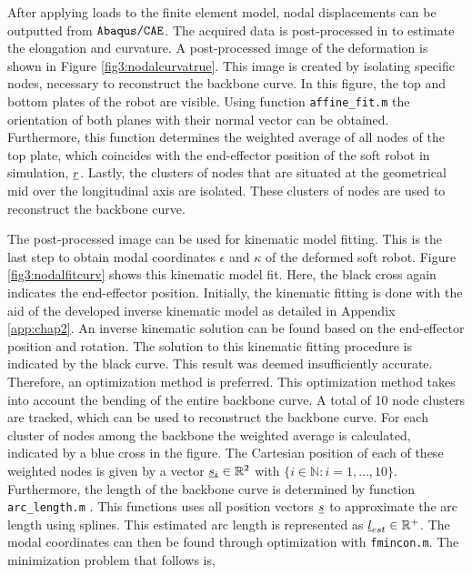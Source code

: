 After applying loads to the finite element model, nodal displacements can be outputted from $\verb+Abaqus/CAE+$. The acquired data is post-processed in \MATLAB to estimate the elongation and curvature. A post-processed image of the deformation is shown in Figure \ref{fig3:nodalcurvatrue}. This image is created by isolating specific nodes, necessary to reconstruct the backbone curve. In this figure, the top and bottom plates of the robot are visible. Using \MATLAB function \verb+affine_fit.m+ \cite{affinefit} the orientation of both planes with their normal vector can be obtained. Furthermore, this function determines the weighted average of all nodes of the top plate, which coincides with the end-effector position of the soft robot in simulation, $\underbar{$r$}$. Lastly, the clusters of nodes that are situated at the geometrical mid over the longitudinal axis are isolated. These clusters of nodes are used to reconstruct the backbone curve. 


The post-processed image can be used for kinematic model fitting. This is the last step to obtain modal coordinates $\epsilon$ and $\kappa$ of the deformed soft robot. Figure \ref{fig3:nodalfitcurv} shows this kinematic model fit. Here, the black cross again indicates the end-effector position. Initially, the kinematic fitting is done with the aid of the developed inverse kinematic model as detailed in Appendix \ref{app:chap2}. An inverse kinematic solution can be found based on the end-effector position and rotation. The solution to this kinematic fitting procedure is indicated by the black curve. This result was deemed insufficiently accurate. Therefore, an optimization method is preferred. This optimization method takes into account the bending of the entire backbone curve. A total of 10 node clusters are tracked, which can be used to reconstruct the backbone curve. For each cluster of nodes among the backbone the weighted average is calculated, indicated by a blue cross in the figure. The Cartesian position of each of these weighted nodes is given by a vector $\underbar{$s_i$} \in \mathbb{R}^2$ with $\{i \in \mathbb{N}: i = {1,\dots,10}\}$. Furthermore, the length of the backbone curve is determined by \MATLAB function \verb+arc_length.m+ \cite{arclength}. This functions uses all position vectors $\underbar{$s$}$ to approximate the arc length using splines. This estimated arc length is represented as $\underbar{$l$}_{est} \in \mathbb{R}^+$. The modal coordinates can then be found through optimization with \verb+fmincon.m+. The minimization problem that follows is,


